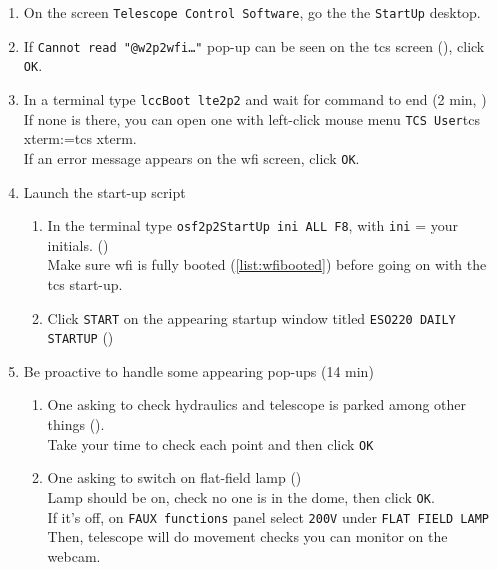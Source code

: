 \documentclass[11pt,fleqn,a4paper]{book}
\makeatletter
\def\menu#1#2{\texttt{#1}\ifx{}#2\else\@for\@x:=#2\do{$\rightarrow$\texttt{\@x}}\fi}
\def\mmenu#1#2{left-click mouse menu \menu{#1}{#2}}
\makeatother
\begin{document}
\begin{enumerate}
\begin{enumerate}
             \label{list:hydr}
          \item On the screen \texttt{Telescope Control Software}, go the the \texttt{StartUp} \gls{desktop}.\label{list:tcs1}
          \item If \texttt{Cannot read "@w2p2wfi…"} pop-up can be seen on the \gls{tcs} screen (), click \texttt{OK}.
          \item In a terminal type \texttt{\gls{lccBoot} \gls{lte2p2}} and wait for command to end (2 min, )\\
                If none is there, you can open one with \mmenu{TCS User}{tcs xterm}.\\
                If an error message appears on the \gls{wfi} screen, click \texttt{OK}. 
          \item Launch the start-up script
          \begin{enumerate}
             \item In the terminal type \texttt{\gls{osf2p2StartUp} ini ALL F8}, with \texttt{ini} = your initials.\label{list:tcsboot} ()\\
                   Make sure \gls{wfi} is fully booted (\ref{list:wfibooted}) before going on with the \gls{tcs} start-up.
              \item Click \texttt{START} on the appearing startup window titled \texttt{ESO220 DAILY STARTUP} ()
          \end{enumerate}
          \item Be proactive to handle some appearing pop-ups (14 min) 
          \begin{enumerate}
             \item One asking to check hydraulics and telescope is parked among other things ().\\
                   Take your time to check each point and then click \texttt{OK}          
             \item One asking to switch on flat-field lamp\label{list:tcsonline} ()\\
                   Lamp should be on, check no one is in the \gls{dome}, then click \texttt{OK}.\\
                   If it's off, on \texttt{FAUX functions} panel select \texttt{200V} under \texttt{FLAT FIELD LAMP}\\
                   Then, telescope will do movement checks you can monitor on the webcam.

\end{enumerate}
\end{enumerate}
\end{enumerate}
\end{document}
